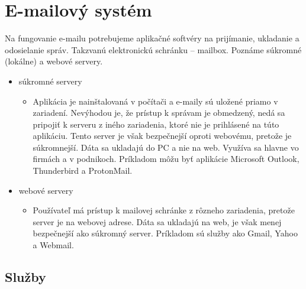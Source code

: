 \documentclass[10pt,slovak,twoside,a4paper]{article}
\begin{document}
\section{E-mailový systém} 

Na fungovanie e-mailu potrebujeme aplikačné softvéry na prijímanie, ukladanie a odosielanie správ. Takzvanú elektronickú schránku – mailbox. Poznáme súkromné (lokálne)  a webové servery. 

\begin{itemize}
\item súkromné servery
   \begin{itemize}
	\item Aplikácia je nainštalovaná v počítači a e-maily sú uložené priamo v zariadení. Nevýhodou je, že prístup k správam je obmedzený, nedá sa pripojiť k serveru z iného zariadenia, ktoré nie je prihlásené na túto aplikáciu. Tento server je však bezpečnejší oproti webovému, pretože je súkromnejší. Dáta sa ukladajú do PC a nie na web. Využíva sa hlavne vo firmách a v podnikoch. Príkladom môžu byť aplikácie Microsoft Outlook, Thunderbird a ProtonMail. 
	\end{itemize}
\item webové servery
	\begin{itemize}
	\item Používateľ má prístup k mailovej schránke z rôzneho zariadenia, pretože server je na webovej adrese. Dáta sa ukladajú na web, je však menej bezpečnejší ako súkromný server. Príkladom sú služby ako Gmail, Yahoo a Webmail.
	\end{itemize}
\end{itemize}

\cite{GORALSKI}

\subsection{Služby} 
\end{document}
